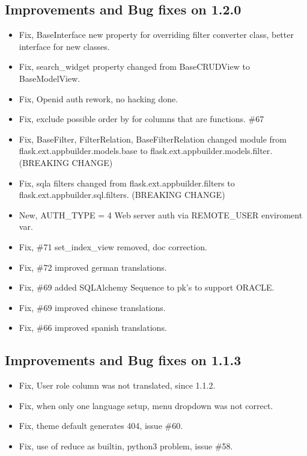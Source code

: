 \documentclass[letterpaper,10pt,english]{sphinxmanual}
\begin{document}
\subsection{Improvements and Bug fixes on 1.2.0}
\label{versions:improvements-and-bug-fixes-on-1-2-0}\begin{itemize}
\item {} 
Fix, BaseInterface new property for overriding filter converter class, better interface for new classes.

\item {} 
Fix, search\_widget property changed from BaseCRUDView to BaseModelView.

\item {} 
Fix, Openid auth rework, no hacking done.

\item {} 
Fix, exclude possible order by for columns that are functions. \#67

\item {} 
Fix, BaseFilter, FilterRelation, BaseFilterRelation changed module from flask.ext.appbuilder.models.base
to flask.ext.appbuilder.models.filter. (BREAKING CHANGE)

\item {} 
Fix, sqla filters changed from flask.ext.appbuilder.filters to flask.ext.appbuilder.sql.filters. (BREAKING CHANGE)

\item {} 
New, AUTH\_TYPE = 4 Web server auth via REMOTE\_USER enviroment var.

\item {} 
Fix, \#71 set\_index\_view removed, doc correction.

\item {} 
Fix, \#72 improved german translations.

\item {} 
Fix, \#69 added SQLAlchemy Sequence to pk's to support ORACLE.

\item {} 
Fix, \#69 improved chinese translations.

\item {} 
Fix, \#66 improved spanish translations.

\end{itemize}


\subsection{Improvements and Bug fixes on 1.1.3}
\label{versions:improvements-and-bug-fixes-on-1-1-3}\begin{itemize}
\item {} 
Fix, User role column was not translated, since 1.1.2.

\item {} 
Fix, when only one language setup, menu dropdown was not correct.

\item {} 
Fix, theme default generates 404, issue \#60.

\item {} 
Fix, use of reduce as builtin, python3 problem, issue \#58.

\end{itemize}
\end{document}
